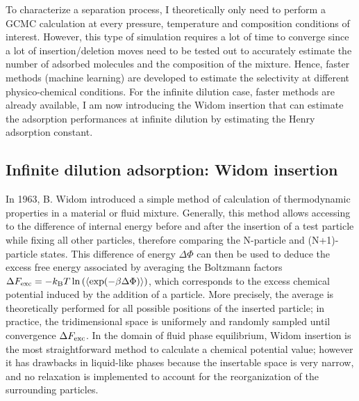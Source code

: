 \documentclass[main.tex]{subfiles}
\begin{document}
To characterize a separation process, I theoretically only need to perform a GCMC calculation at every pressure, temperature and composition conditions of interest. However, this type of simulation requires a lot of time to converge since a lot of insertion/deletion moves need to be tested out to accurately estimate the number of adsorbed molecules and the composition of the mixture. Hence, faster methods (machine learning) are developed to estimate the selectivity at different physico-chemical conditions.\autocite{Simon_2015,Kang_2023} For the infinite dilution case, faster methods are already available, I am now introducing the Widom insertion that can estimate the adsorption performances at infinite dilution by estimating the Henry adsorption constant.


\subsection{Infinite dilution adsorption: Widom insertion}\label{sct:widom}

In 1963, B. Widom introduced a simple method of calculation of thermodynamic properties in a material or fluid mixture.\autocite{Widom1963} Generally, this method allows accessing to the difference of internal energy before and after the insertion of a test particle while fixing all other particles, therefore comparing the N-particle and (N+1)-particle states. This difference of energy $\Delta \Phi$ can then be used to deduce the excess free energy associated by averaging the Boltzmann factors $\Delta F_{\text{exc}} = -k_{\text{B}} T \ln\left(\langle \exp(- \beta\Delta \Phi) \rangle\right)$, which corresponds to the excess chemical potential induced by the addition of a particle. More precisely, the average is theoretically performed for all possible positions of the inserted particle; in practice, the tridimensional space is uniformely and randomly sampled until convergence $\Delta F_{\text{exc}}$. In the domain of fluid phase equilibrium, Widom insertion is the most straightforward method to calculate a chemical potential value; however it has drawbacks in liquid-like phases because the insertable space is very narrow, and no relaxation is implemented to account for the reorganization of the surrounding particles.\autocite{Nezbeda_1991} 
\end{document}

